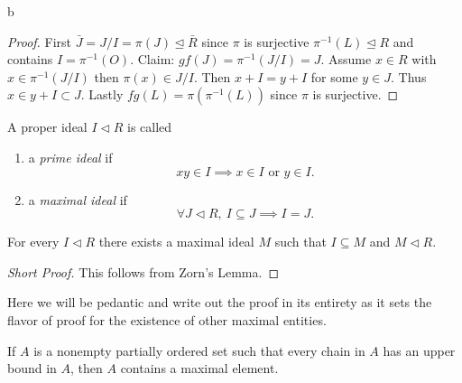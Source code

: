 b\documentclass[master.tex]{subfiles}
\begin{document}
\begin{proof}
  First \(\bar{J}=J/I=\pi(J)\unlhd \bar{R}\) since \(\pi\) is surjective \(\pi^{-1}(L) \unlhd R\) and contains
  \(I=\pi^{-1}(O)\). Claim: \(gf(J)=\pi^{-1}(J/I)=J\). Assume \(x \in R\) with \(x \in \pi^{-1}(J/I)\) then
  \(\pi(x) \in J/I\). Then \(x+I=y+I\) for some \(y \in J\). Thus \(x \in y + I \subset J\). Lastly
  \(fg(L)=\pi(\pi^{-1}(L))\) since \(\pi\) is surjective.
\end{proof}

\begin{defn}
  A proper ideal \(I \lhd R\) is called
  \begin{enumerate}
  \item a \emph{prime ideal} if
    \[xy \in I \implies x \in I \text{ or } y \in I.\]
  \item a \emph{maximal ideal} if
    \[\forall J \lhd R,\ I \subseteq J \implies I=J.\]
  \end{enumerate}
\end{defn}

\begin{prop}
  For every \(I \lhd R\) there exists a maximal ideal \(M\) such that \(I \subseteq M\) and \(M \lhd R\).
\end{prop}

\begin{proof}[Short Proof]
  This follows from Zorn's Lemma.
\end{proof}

Here we will be pedantic and write out the proof in its entirety as it sets the flavor of proof for the existence of
other maximal entities.

\begin{lem*}
  If \(A\) is a nonempty partially ordered set such that every chain in \(A\) has an upper bound in \(A\), then \(A\)
  contains a maximal element.
\end{lem*}
\end{document}
